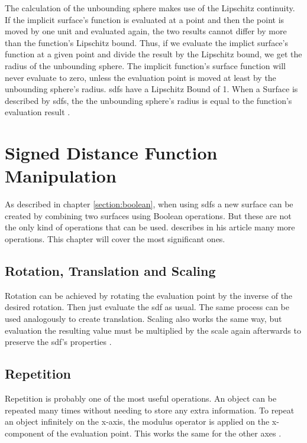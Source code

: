 The calculation of the unbounding sphere makes use of the Lipschitz continuity. If the implicit surface's function is evaluated at a point and then the point is moved by one unit and evaluated again, the two results cannot differ by more than the function's Lipschitz bound. Thus, if we evaluate the implict surface's function at a given point and divide the result by the Lipschitz bound, we get the radius of the unbounding sphere. The implicit function's surface function will never evaluate to zero, unless the evaluation point is moved at least by the unbounding sphere's radius. \Glspl{sdf} have a Lipschitz Bound of 1. When a Surface is described by  \glspl{sdf}, the the unbounding sphere's radius is equal to the function's evaluation result \cite{hart:1996:sphere}.

\section{Signed Distance Function Manipulation}
As described in chapter \ref{section:boolean}, when using \glspl{sdf} a new surface can be created by combining two surfaces using Boolean operations. But these are not the only kind of operations that can be used. \textcite{quilez:2008:distfunctions} describes in his article many more operations. This chapter will cover the most significant ones.

\subsection{Rotation, Translation and Scaling}
Rotation can be achieved by rotating the evaluation point by the inverse of the desired rotation. Then just evaluate the \gls{sdf} as usual. The same process can be used analogously to create translation. Scaling also works the same way, but evaluation the resulting value must be multiplied by the scale again afterwards to preserve the \gls{sdf}'s properties \cite{quilez:2008:distfunctions}.

\subsection{Repetition}
Repetition is probably one of the most useful operations. An object can be repeated many times without needing to store any extra information. To repeat an object infinitely on the x-axis, the modulus operator is applied on the x-component of the evaluation point. This works the same for the other axes \cite{quilez:2008:distfunctions}.

